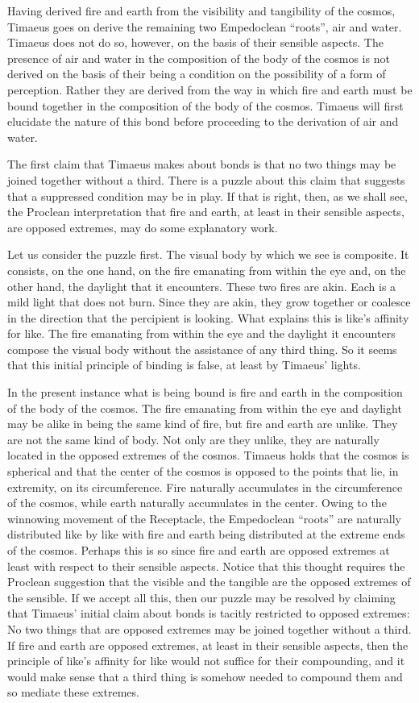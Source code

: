 Having derived fire and earth from the visibility and tangibility of the cosmos, Timaeus goes on derive the remaining two Empedoclean ``roots'', air and water. Timaeus does not do so, however, on the basis of their sensible aspects. The presence of air and water in the composition of the body of the cosmos is not derived on the basis of their being a condition on the possibility of a form of perception. Rather they are derived from the way in which fire and earth must be bound together in the composition of the body of the cosmos. Timaeus will first elucidate the nature of this bond before proceeding to the derivation of air and water.

The first claim that Timaeus makes about bonds is that no two things may be joined together without a third. There is a puzzle about this claim that suggests that a suppressed condition may be in play. If that is right, then, as we shall see, the Proclean interpretation that fire and earth, at least in their sensible aspects, are opposed extremes, may do some explanatory work.

Let us consider the puzzle first. The visual body by which we see is composite. It consists, on the one hand, on the fire emanating from within the eye and, on the other hand, the daylight that it encounters. These two fires are akin. Each is a mild light that does not burn. Since they are akin, they grow together or coalesce in the direction that the percipient is looking. What explains this is like's affinity for like. The fire emanating from within the eye and the daylight it encounters compose the visual body without the assistance of any third thing. So it seems that this initial principle of binding is false, at least by Timaeus' lights.

In the present instance what is being bound is fire and earth in the composition of the body of the cosmos. The fire emanating from within the eye and daylight may be alike in being the same kind of fire, but fire and earth are unlike. They are not the same kind of body. Not only are they unlike, they are naturally located in the opposed extremes of the cosmos. Timaeus holds that the cosmos is spherical and that the center of the cosmos is opposed to the points that lie, in extremity, on its circumference. Fire naturally accumulates in the circumference of the cosmos, while earth naturally accumulates in the center. Owing to the winnowing movement of the Receptacle, the Empedoclean ``roots'' are naturally distributed like by like with fire and earth being distributed at the extreme ends of the cosmos. Perhaps this is so since fire and earth are opposed extremes at least with respect to their sensible aspects. Notice that this thought requires the Proclean suggestion that the visible and the tangible are the opposed extremes of the sensible. If we accept all this, then our puzzle may be resolved by claiming that Timaeus' initial claim about bonds is tacitly restricted to opposed extremes: No two things that are opposed extremes may be joined together without a third. If fire and earth are opposed extremes, at least in their sensible aspects, then the principle of like's affinity for like would not suffice for their compounding, and it would make sense that a third thing is somehow needed to compound them and so mediate these extremes.

